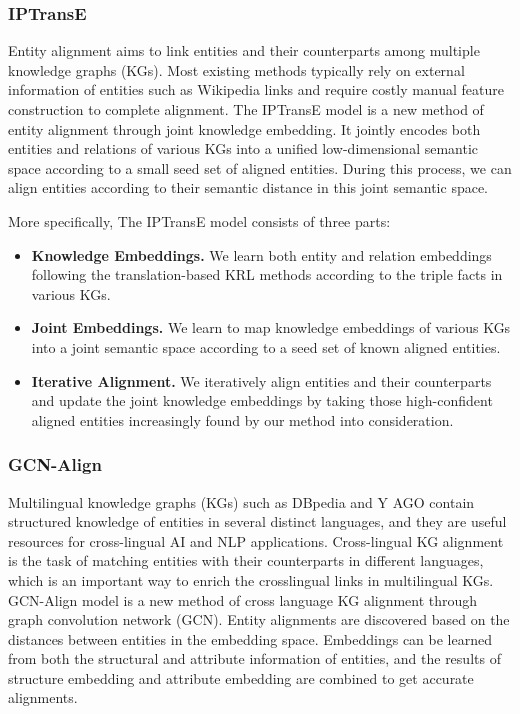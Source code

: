 \documentclass[sigconf]{acmart}
\begin{document}
{\subsubsection{IPTransE \cite{zhu2017iterative}}

Entity alignment aims to link entities and their counterparts among multiple knowledge graphs (KGs). Most existing methods typically rely on external information of entities such as Wikipedia links and require costly manual feature construction to complete alignment. The IPTransE model is a new method of entity alignment through joint knowledge embedding. It jointly encodes both entities and relations of various KGs into a unified low-dimensional semantic space according to a small seed set of aligned entities. During this process, we can align entities according to their semantic distance in this joint semantic space. 

More specifically, The IPTransE model consists of three parts: 
\begin{itemize}
\item{\bfseries Knowledge Embeddings.} We learn both entity and relation embeddings following the translation-based KRL methods according to the triple facts in various KGs.
\item{\bfseries Joint Embeddings.} We learn to map knowledge embeddings of various KGs into a joint semantic space according to a seed set of known aligned entities. 
\item{\bfseries Iterative Alignment.} We iteratively align entities and their counterparts and update the joint knowledge embeddings by taking those high-confident aligned entities increasingly found by our method into consideration.
\end{itemize}

\subsubsection{GCN-Align \cite{wang2018cross}}

Multilingual knowledge graphs (KGs) such as DBpedia and Y AGO contain structured knowledge of entities in several distinct languages, and they are useful resources for cross-lingual AI and NLP applications. Cross-lingual KG alignment is the task of matching entities with their counterparts in different languages, which is an important way to enrich the crosslingual links in multilingual KGs. GCN-Align model is a new method of cross language KG alignment through graph convolution network (GCN). Entity alignments are discovered based on the distances between entities in the embedding space. Embeddings can be learned from both the structural and attribute information of entities, and the results of structure embedding and attribute embedding are combined to get accurate alignments.

}
\end{document}
